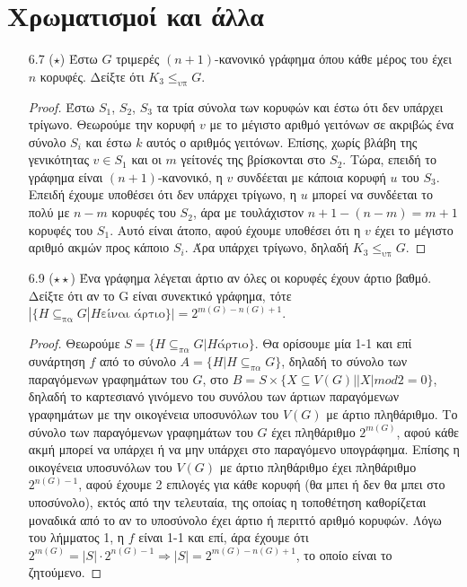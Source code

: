 \documentclass[a4paper, oneside, 11pt]{article}
\theoremstyle{definition}
\begin{document}
\section{Χρωματισμοί και άλλα}
\begin{enumerate}

\item[6.7 ($\star$)]
Έστω $G$ τριμερές $(n+1)$-κανονικό γράφημα όπου κάθε μέρος του έχει $n$ κορυφές. Δείξτε ότι $K_3 \leq_{\text{υπ}} G$.

\begin{proof}
Έστω $S_1$, $S_2$, $S_3$ τα τρία σύνολα των κορυφών και έστω ότι δεν υπάρχει τρίγωνο. Θεωρούμε την κορυφή $v$ με το μέγιστο αριθμό γειτόνων σε ακριβώς ένα σύνολο $S_i$ και έστω $k$ αυτός ο αριθμός γειτόνων.
Επίσης, χωρίς βλάβη της γενικότητας $v\in S_1$ και οι $m$ γείτονές της βρίσκονται στο $S_2$. Τώρα, επειδή το γράφημα είναι $(n+1)$-κανονικό, η $v$ συνδέεται με κάποια κορυφή $u$ του $S_3$. Επειδή έχουμε
υποθέσει ότι δεν υπάρχει τρίγωνο, η $u$ μπορεί να συνδέεται το πολύ με $n-m$ κορυφές του $S_2$, άρα με τουλάχιστον $n+1-(n-m)=m+1$ κορυφές του $S_1$. Αυτό είναι άτοπο, αφού έχουμε υποθέσει ότι η $v$ έχει
το μέγιστο αριθμό ακμών προς κάποιο $S_i$. Άρα υπάρχει τρίγωνο, δηλαδή $K_3 \leq_{\text{υπ}} G$.
\end{proof}

\item[6.9 ($\star\star$)]
   Ένα γράφημα λέγεται άρτιο αν όλες οι κορυφές έχουν άρτιο βαθμό. Δείξτε ότι αν το G είναι συνεκτικό γράφημα, τότε 
   $|\{H\subseteq_{\text{πα}} G | H \text{είναι άρτιο}\}| = 2^{m(G)-n(G)+1}$.

   \begin{proof}
Θεωρούμε $S = \{H\subseteq_{\pi \alpha} G | H \text{άρτιο}\}$.
     Θα ορίσουμε μία 1-1 και επί συνάρτηση $f$ από το σύνολο 
$A = \{H | H\subseteq_{\pi\alpha} G\}$, δηλαδή το σύνολο των παραγόμενων γραφημάτων 
του $G$, στο $B = S\times \{X\subseteq V(G) | |X| mod 2 = 0\}$, 
δηλαδή το καρτεσιανό γινόμενο του συνόλου των άρτιων παραγόμενων γραφημάτων 
με την οικογένεια υποσυνόλων του $V(G)$ με άρτιο πληθάριθμο. Το σύνολο των 
παραγόμενων γραφημάτων του $G$ έχει πληθάριθμο $2^{m(G)}$, αφού κάθε ακμή 
μπορεί να υπάρχει ή να μην υπάρχει στο παραγόμενο υπογράφημα. 
Επίσης η οικογένεια υποσυνόλων του $V(G)$ με άρτιο πληθάριθμο έχει πληθάριθμο 
$2^{n(G)-1}$, αφού έχουμε 2 επιλογές για κάθε κορυφή (θα μπει ή δεν θα μπει 
στο υποσύνολο), εκτός από την τελευταία, της οποίας η τοποθέτηση καθορίζεται 
μοναδικά από το αν το υποσύνολο έχει άρτιο ή περιττό αριθμό κορυφών. Λόγω 
του λήμματος 1, η $f$ είναι 1-1 και επί, άρα έχουμε ότι 
$2^{m(G)} = |S| \cdot 2^{n(G)-1} \Rightarrow |S| = 2^{m(G)-n(G)+1}$, το οποίο 
είναι το ζητούμενο.
   \end{proof}



\end{enumerate}
\end{document}
